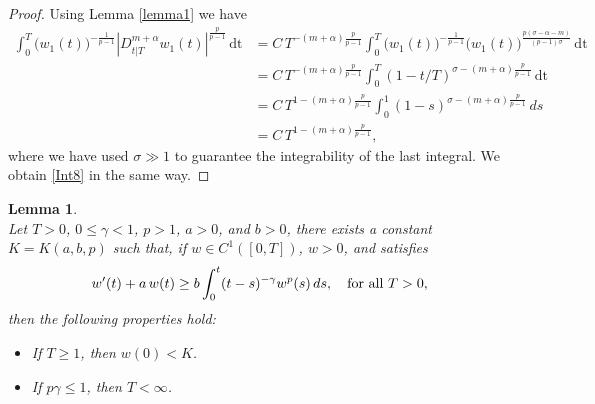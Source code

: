 \documentclass[reqno,11pt]{amsart}
\newtheorem{lemma}[theorem]{Lemma}
\numberwithin{equation}{section}
\begin{document}
\begin{proof}
	Using Lemma \ref{lemma1} we have
	\begin{align*}
		\int_{0}^T \big(w_1(t)\big)^{-\frac{1}{p-1}}|D_{t|T}^{m+\alpha}w_1(t)|^{\frac{p}{p-1}}\,\mathrm{dt} &= C\,T^{-(m+\alpha)\frac{p}{p-1}}\int_{0}^T \big(w_1(t)\big)^{-\frac{1}{p-1}}\big(w_1(t)\big)^{\frac{p({\sigma}-\alpha-m)}{(p-1)\sigma}}\,\mathrm{dt}\\
		&= C\,T^{-(m+\alpha)\frac{p}{p-1}}\int_{0}^T(1-t/T)^{\sigma-(m+\alpha)\frac{ p}{p-1}}\,\mathrm{dt}\\
		&= C\,T^{1-(m+\alpha)\frac{p}{p-1}}\int_{0}^1(1-s)^{\sigma-(m+\alpha)\frac{ p}{p-1}}\,ds\\
		&= C\,T^{1-(m+\alpha)\frac{p}{p-1}},
	\end{align*}
	where we have used $\sigma \gg1$ to guarantee the integrability of the last integral. We obtain \eqref{Int8} in the same way.
\end{proof}


\begin{lemma}\cite[Proposition~2.2]{CDW}\label{lemma3} \\
	Let $T>0$, $0\leq \gamma<1$, $p>1$, $a>0$, and $b>0$, there exists a constant $K=K(a,b,p)$ such that, if $w\in C^1([0,T])$, $w>0$, and satisfies 
	$$w'(t)+a\,w(t)\geq b\int_0^t(t-s)^{-\gamma}w^p(s)\,ds,\quad\hbox{for all}\,\,T>0,$$
	then the following properties hold:
	\begin{itemize}
		\item[$\mathrm{(i)}$] If $T\geq 1$, then $w(0)<K$.
		\item[$\mathrm{(ii)}$] If $p\gamma\leq 1$, then $T<\infty$.
	\end{itemize}
\end{lemma}
\end{document}
